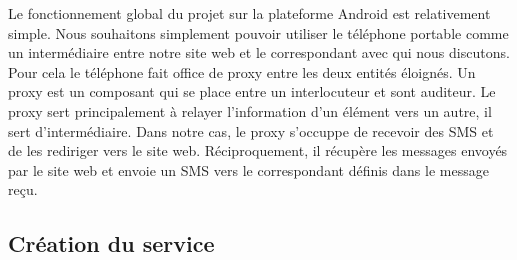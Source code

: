Le fonctionnement global du projet sur la plateforme Android est relativement simple. Nous souhaitons
simplement pouvoir utiliser le téléphone portable comme un intermédiaire entre notre site web et le 
correspondant avec qui nous discutons. Pour cela le téléphone fait office de proxy entre les deux 
entités éloignés. Un proxy est un composant qui se place entre un interlocuteur et sont auditeur. Le 
proxy sert principalement à relayer l'information d'un élément vers un autre, il sert d'intermédiaire.
Dans notre cas, le proxy s'occuppe de recevoir des SMS et de les rediriger vers le site web. 
Réciproquement, il récupère les messages envoyés par le site web et envoie un SMS vers le correspondant
définis dans le message reçu.



\subsection{Création du service}



